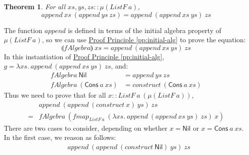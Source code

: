 \documentclass{jfp1}
\newcommand{\fold}[1]{\llparenthesis #1 \rrparenthesis}
\newtheorem{theorem}{Theorem}
\newcommand{\proofprinref}[1]{\hyperref[#1]{Proof Principle \ref*{#1}}}
\begin{document}
\begin{theorem}\label{thm:append-assoc}
  For all $\mathit{xs}, \mathit{ys}, \mathit{zs} :: \mu(\mathit{ListF}~a)$,
  \begin{displaymath}
    \mathit{append}~\mathit{xs}~(\mathit{append}~\mathit{ys}~\mathit{zs}) = \mathit{append}~(\mathit{append}~\mathit{xs}~\mathit{ys})~\mathit{zs}
  \end{displaymath}
\end{theorem}

\begin{proof*}
  The function $\mathit{append}$ is defined in terms of the initial
  algebra property of $\mu(\mathit{ListF}~a)$, so we can use
  \proofprinref{pp:initial-alg} to prove the equation:
  \begin{displaymath}
    \fold{\mathit{fAlgebra}}~\mathit{xs} = \mathit{append}~(\mathit{append}~\mathit{xs}~\mathit{ys})~\mathit{zs}
  \end{displaymath}
  In this instantiation of \proofprinref{pp:initial-alg}, $g = \lambda
  \mathit{xs}.~\mathit{append}~(\mathit{append}~\mathit{xs}~\mathit{ys})~\mathit{zs}$,
  and:
  \begin{align}
    \label{eq:append-fAlgebra-nil}
    \mathit{fAlgebra}~\mathsf{Nil} &= \mathit{append}~\mathit{ys}~\mathit{zs} \\
    \label{eq:append-fAlgebra-cons}
    \mathit{fAlgebra}~(\mathsf{Cons}~a~\mathit{xs}) &= \mathit{construct}~(\mathsf{Cons}~a~\mathit{xs})
  \end{align}
  Thus we need to prove that for all $x ::
  \mathit{ListF}~a~(\mu(\mathit{ListF}~a))$,
  \begin{displaymath}
    \begin{array}{cl}
      &\mathit{append}~(\mathit{append}~(\mathit{construct}~x)~\mathit{ys})~\mathit{zs}\\
      =&\mathit{fAlgebra}~(\mathit{fmap}_{\mathit{ListF}~a}~(\lambda \mathit{xs}.~\mathit{append}~(\mathit{append}~\mathit{xs}~\mathit{ys})~\mathit{zs})~x)
    \end{array}
  \end{displaymath}
  There are two cases to consider, depending on whether $x =
  \mathsf{Nil}$ or $x = \mathsf{Cons}~a~\mathit{xs}$. In the first
  case, we reason as follows:
  \begin{displaymath}
    \begin{array}{cl}
      & \mathit{append}~(\mathit{append}~(\mathit{construct}~\mathsf{Nil})~\mathit{ys})~\mathit{zs}\\

\end{array}
\end{displaymath}
\end{proof*}
\end{document}
